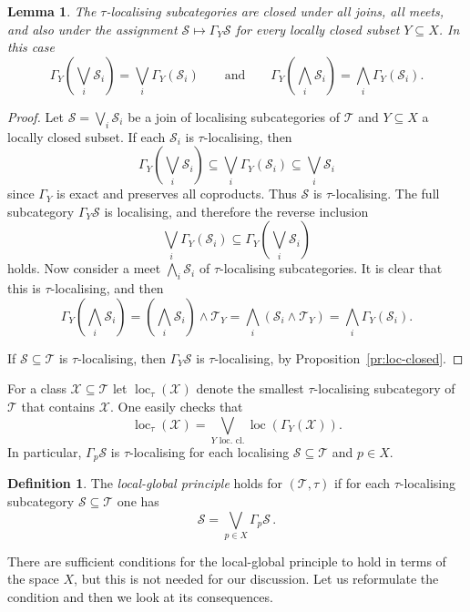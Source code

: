\documentclass{amsart}[a4]
\newtheorem{lemma}[theorem]{Lemma}
\theoremstyle{definition}
\newtheorem{definition}[theorem]{Definition}
\theoremstyle{remark}
\numberwithin{equation}{section}
\newcommand{\loc}{\operatorname{loc}}
\newcommand{\cat}{\mathcal}
\let\Gamma\varGamma
\begin{document}
\begin{lemma}\label{le:tau-local}
  The  $\tau$-localising subcategories are closed
  under all joins, all meets, and also under the assignment
  $\cat S\mapsto\Gamma_Y\cat S$ for every locally closed subset
  $Y\subseteq X$. In this case
  \[\Gamma_Y\left(\bigvee_i \cat S_i\right)=\bigvee_i \Gamma_Y(\cat
    S_i)\qquad\text{and}\qquad \Gamma_Y\left(\bigwedge_i \cat S_i\right)=\bigwedge_i \Gamma_Y(\cat
    S_i).\]
\end{lemma}  
\begin{proof}
  Let $\cat S=\bigvee_i\cat S_i$ be a join of localising subcategories
  of $\cat T$ and $Y\subseteq X$ a locally closed subset. If each
  $\cat S_i$ is $\tau$-localising, then
\[\Gamma_Y\left(\bigvee_i \cat S_i\right)\subseteq \bigvee_i
  \Gamma_Y(\cat S_i) \subseteq \bigvee_i \cat S_i\]
since  $\Gamma_Y$ is exact and preserves all
  coproducts. Thus $\cat S$ is $\tau$-localising. The full subcategory
  $\Gamma_Y\cat S$ is localising, and therefore the reverse inclusion
\[\bigvee_i \Gamma_Y(\cat S_i)\subseteq \Gamma_Y\left(\bigvee_i \cat S_i\right)\]
holds. Now consider a meet $\bigwedge_i\cat S_i$ of $\tau$-localising
subcategories. It is clear that this is $\tau$-localising, and  then
\[\Gamma_Y\left(\bigwedge_i \cat S_i\right)=\left(\bigwedge_i \cat
    S_i\right) \wedge\cat T_Y=\bigwedge_i \left(\cat
    S_i\wedge\cat T_Y\right) =\bigwedge_i \Gamma_Y(\cat S_i).\]

If $\cat S\subseteq\cat T$ is $\tau$-localising, then $\Gamma_Y\cat S$ is
$\tau$-localising, by Proposition~\ref{pr:loc-closed}.
\end{proof}

For a class $\cat X\subseteq\cat T$ let $\loc_\tau(\cat X)$ denote the smallest
$\tau$-localising subcategory of $\cat T$ that contains $\cat X$. One
easily checks that
\[\loc_\tau(\cat X)=\bigvee_{Y\text{ loc.\ cl.}}\loc(\Gamma_Y(\cat X)).\]
In particular, $\Gamma_p\cat S$ is $\tau$-localising for each
localising $\cat S\subseteq\cat T$ and $p\in X$.

\begin{definition}
  The \emph{local-global principle} holds for $(\cat T,\tau)$ if for each
  $\tau$-localising subcategory $\cat S\subseteq\cat T$ one has
  \[\cat S=\bigvee_{p\in X}\Gamma_p\cat S\,.\]
\end{definition}

There are sufficient conditions for the local-global principle
to hold in terms of the space $X$, but this is not needed for our discussion.
Let us reformulate the condition and then we look at its consequences.
\end{document}
